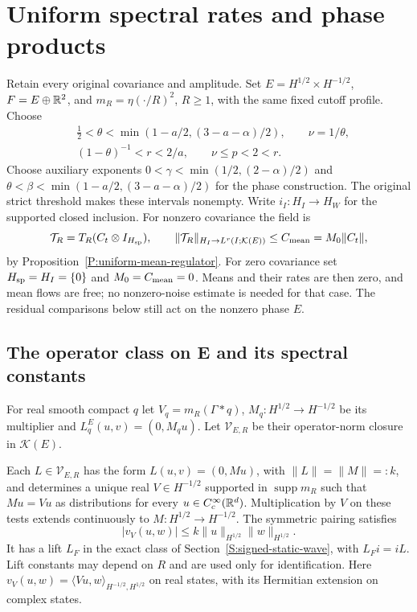 \section{Uniform spectral rates and phase products}
\label{S:uniform-physical-products}

Retain every original covariance and amplitude. Set $E = H^{1/2}\times
H^{-1/2}$, $F = E\oplus\mathbb{R}^2$, and $m_R = \eta(\cdot/R)^2$, $R \ge 1$, with the
same fixed cutoff profile. Choose
\[
  \begin{aligned}
    &\frac12<\theta<\min(1-a/2,(3-a-\alpha)/2),\qquad \nu=1/\theta,\\
    &(1-\theta)^{-1}<r<2/a,\qquad \nu\le p<2<r .
  \end{aligned}
\]
Choose auxiliary exponents $0 < \gamma < \min(1/2,(2-\alpha)/2)$ and $\theta <
\beta < \min(1-a/2,(3-a-\alpha)/2)$ for the phase construction. The original
strict threshold makes these intervals nonempty. Write $i_I:H_I \to H_W$ for the
supported closed inclusion. For nonzero covariance the field is
\[
  \mathcal{T}_R=T_R(C_t\otimes I_{H_{\rm sp}}),\qquad
  \|\mathcal{T}_R\|_{H_I\to L^r(I;\mathcal{K}(E))}
  \le C_{\rm mean}=M_0\|C_t\| ,
\]
by Proposition~\ref{P:uniform-mean-regulator}. For zero covariance set $H_{\rm
sp} = H_I = \{0\}$ and $M_0 = C_{\rm mean} = 0$. Means and their rates are then
zero, and mean flows are free; no nonzero-noise estimate is needed for that
case. The residual comparisons below still act on the nonzero phase $E$.

\subsection{The operator class on E and its spectral constants}

For real smooth compact $q$ let $V_q = m_R(\Gamma*q)$, $M_q:H^{1/2} \to
H^{-1/2}$ be its multiplier and $L_q^E(u,v) = (0,M_qu)$. Let $\mathcal{V}_{E,R}$
be their operator-norm closure in $\mathcal{K}(E)$.
%
\begin{lemma}\label{L:uniform-E-lift}
  Each $L \in \mathcal{V}_{E,R}$ has the form $L(u,v) = (0,Mu)$, with $\|L\| =
  \|M\| = :k$, and determines a unique real $V \in H^{-1/2}$ supported in
  $\operatorname{supp}m_R$ such that $Mu = Vu$ as distributions for every
  $u \in C_c^\infty(\mathbb{R}^d)$. Multiplication by $V$ on these tests extends
  continuously to $M:H^{1/2}\to H^{-1/2}$. The symmetric pairing satisfies
  \begin{equation}\label{E:uniform-E-pairing}
    |v_V(u,w)|\le k\|u\|_{H^{1/2}}\|w\|_{H^{1/2}} .
  \end{equation}
  It has a lift $L_F$ in the exact class of Section~\ref{S:signed-static-wave},
  with $L_Fi = iL$. Lift constants may depend on $R$ and are used only for
  identification. Here $v_V(u,w) = \langle Vu,w\rangle_{H^{-1/2},H^{1/2}}$ on
  real states, with its Hermitian extension on complex states.
\end{lemma}

